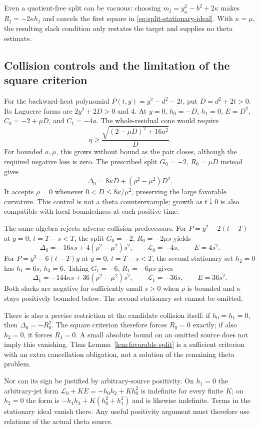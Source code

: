 \documentclass[11pt]{article}
\numberwithin{equation}{section}
\theoremstyle{definition}
\theoremstyle{remark}
\newcommand{\Lag}{\mathcal L}
\begin{document}
Even a quotient-free split can be vacuous: choosing
$m_j=y_\alpha^2-b^2+2\kappa$ makes $R_j=-2\kappa h_j$ and cancels
the first square in \eqref{eq:split-stationary-ideal}. With $\kappa=\mu$,
the resulting slack condition only restates the target and supplies no
theta estimate.

\subsection{Collision controls and the limitation of the square criterion}

For the backward-heat polynomial $P(t,y)=y^2-d^2-2t$, put
$D=d^2+2t>0$. Its Laguerre forms are $2y^2+2D>0$ and $4$.
At $y=0$, $h_0=-D$, $h_1=0$, $E=D^2$, $C_0=-2+\mu D$, and
$C_1=-4a$. The whole-residual cone would require
\begin{equation}
 \eta\ge\frac{\sqrt{(2-\mu D)^2+16a^2}}{D}.
 \label{eq:close-pair-cone}
\end{equation}
For bounded $a,\mu$, this grows without bound as the pair closes,
although the required negative loss is zero. The prescribed split
$G_0=-2$, $R_0=\mu D$ instead gives
\[
 \Delta_0=8\kappa D+(\rho^2-\mu^2)D^2.
\]
It accepts $\rho=0$ whenever $0<D\le8\kappa/\mu^2$, preserving the
large favorable curvature. This control is not a theta counterexample;
growth as $t\downarrow0$ is also compatible with local boundedness at
each positive time.

The same algebra rejects adverse collision predecessors. For
$P=y^2-2(t-T)$ at $y=0$, $t=T-s<T$, the split
$G_0=-2$, $R_0=-2\mu s$ yields
\[
 \Delta_0=-16\kappa s+4(\rho^2-\mu^2)s^2,\qquad
 \Lag_0=-4s,\qquad E=4s^2.
\]
For $P=y^3-6(t-T)y$ at $y=0$, $t=T-s<T$, the second stationary
set $h_2=0$ has $h_1=6s$, $h_3=6$. Taking $G_1=-6$,
$R_1=-6\mu s$ gives
\[
 \Delta_1=-144\kappa s+36(\rho^2-\mu^2)s^2,\qquad
 \Lag_1=-36s,\qquad E=36s^2.
\]
Both slacks are negative for sufficiently small $s>0$ when $\rho$
is bounded and $\kappa$ stays positively bounded below. The second
stationary set cannot be omitted.

There is also a precise restriction at the candidate collision itself:
if $h_0=h_1=0$, then $\Delta_0=-R_0^2$. The square criterion therefore
forces $R_0=0$ exactly; if also $h_2=0$, it forces $R_1=0$.
A small absolute bound on an omitted source does not imply this
vanishing. Thus Lemma~\ref{lem:favorable-split} is a sufficient
criterion with an extra cancellation obligation, not a solution of the
remaining theta problem.

Nor can its sign be justified by arbitrary-source positivity. On
$h_1=0$ the arbitrary-jet form $\Lag_0+KE=-h_0h_2+Kh_0^2$ is
indefinite for every finite $K$; on $h_2=0$ the form is
$-h_1h_3+K(h_0^2+h_1^2)$ and is likewise indefinite. Terms in the
stationary ideal vanish there. Any useful positivity argument must
therefore use relations of the actual theta source.
\end{document}
